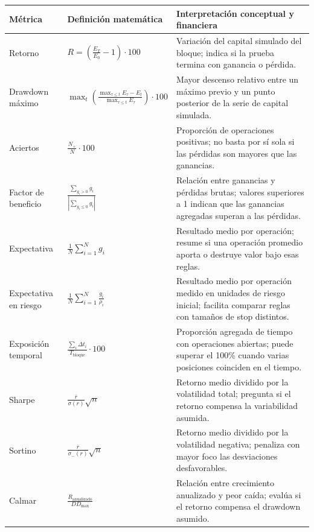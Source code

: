 \begin{table}[H]
\centering
\scriptsize
\setlength{\tabcolsep}{4pt}
\renewcommand{\arraystretch}{1.13}
\begin{tabular}{p{} p{} p{}}
\hline
\textbf{M\'etrica} & \textbf{Definici\'on matem\'atica} & \textbf{Interpretaci\'on conceptual y financiera} \\
\hline
Retorno & \(R = \left(\frac{E_T}{E_0}-1\right)\cdot 100\) & Variaci\'on del capital simulado del bloque; indica si la prueba termina con ganancia o p\'erdida. \\
Drawdown m\'aximo & \(\max_t \left(\frac{\max_{\tau \leq t} E_\tau - E_t}{\max_{\tau \leq t} E_\tau}\right)\cdot 100\) & Mayor descenso relativo entre un m\'aximo previo y un punto posterior de la serie de capital simulada. \\
Aciertos & \(\frac{N_+}{N}\cdot 100\) & Proporci\'on de operaciones positivas; no basta por s\'i sola si las p\'erdidas son mayores que las ganancias. \\
Factor de beneficio & \(\frac{\sum_{g_i>0} g_i}{|\sum_{g_i\leq 0} g_i|}\) & Relaci\'on entre ganancias y p\'erdidas brutas; valores superiores a 1 indican que las ganancias agregadas superan a las p\'erdidas. \\
Expectativa & \(\frac{1}{N}\sum_{i=1}^{N} g_i\) & Resultado medio por operaci\'on; resume si una operaci\'on promedio aporta o destruye valor bajo esas reglas. \\
Expectativa en riesgo & \(\frac{1}{N}\sum_{i=1}^{N}\frac{g_i}{\rho_i}\) & Resultado medio por operaci\'on medido en unidades de riesgo inicial; facilita comparar reglas con tama\~nos de stop distintos. \\
Exposici\'on temporal & \(\frac{\sum_i \Delta t_i}{T_\text{bloque}}\cdot 100\) & Proporci\'on agregada de tiempo con operaciones abiertas; puede superar el 100\% cuando varias posiciones coinciden en el tiempo. \\
Sharpe & \(\frac{\overline{r}}{\sigma(r)}\sqrt{n}\) & Retorno medio dividido por la volatilidad total; pregunta si el retorno compensa la variabilidad asumida. \\
Sortino & \(\frac{\overline{r}}{\sigma_-(r)}\sqrt{n}\) & Retorno medio dividido por la volatilidad negativa; penaliza con mayor foco las desviaciones desfavorables. \\
Calmar & \(\frac{R_\text{anualizado}}{DD_\text{max}}\) & Relaci\'on entre crecimiento anualizado y peor ca\'ida; eval\'ua si el retorno compensa el drawdown asumido. \\

\end{tabular}
\end{table}
